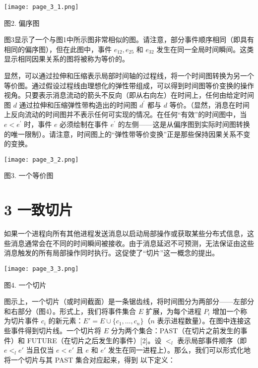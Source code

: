 \documentclass[12pt,a4paper]{report} %
\begin{document}
\begin{center}
\texttt{[image: page\_3\_1.png]}
\end{center}
\begin{center}
图2. 偏序图
\end{center}

图3显示了一个与图1中所示图非常相似的图。请注意，部分事件顺序相同（即具有相同的偏序图），但在此图中，事件 $e_{12}, e_{25}$ 和 $e_{32}$ 发生在同一全局时间瞬间。这类显示相同因果关系的图将被称为等价的。

显然，可以通过拉伸和压缩表示局部时间轴的过程线，将一个时间图转换为另一个等价图。通过假设过程线由理想化的弹性带组成，可以得到时间图等价变换的操作视角。只要表示消息流动的箭头不反向（即从右向左）在时间上，任何由给定时间图 $d$ 通过拉伸和压缩弹性带构造出的时间图 $d^{\prime}$ 都与 $d$ 等价。（显然，消息在时间上反向流动的时间图并不表示任何可实现的情况。在任何“有效”的时间图中，当 $e<e^{\prime}$ 时，事件 $e$ 必须绘制在事件 $e^{\prime}$ 的左侧——这是从偏序图到实际时间图转换的唯一限制）。请注意，时间图上的“弹性带等价变换”正是那些保持因果关系不变的变换。

\begin{center}
\texttt{[image: page\_3\_2.png]}
\end{center}
\begin{center}
图3. 一个等价图
\end{center}

\section*{3 一致切片}

如果一个进程向所有其他进程发送消息以启动局部操作或获取某些分布式信息，这些消息通常会在不同的时间瞬间被接收。由于消息延迟不可预测，无法保证由这些消息触发的所有局部操作同时执行。这促使了“切片”这一概念的提出。

\begin{center}
\texttt{[image: page\_3\_3.png]}
\end{center}
\begin{center}
图4. 一个切片
\end{center}

图示上，一个切片（或时间截面）是一条锯齿线，将时间图分为两部分——左部分和右部分（图4）。形式上，我们将事件集合 $E$ 扩展，为每个进程 $P_i$ 增加一个称为切片事件 $c_i$ 的新元素：$E' = E \cup \{c_1, \ldots, c_n\}$（$n$ 表示进程数量）。在图中连接这些事件得到切片线。一个切片将 $E$ 分为两个集合：PAST（在切片之前发生的事件）和 FUTURE（在切片之后发生的事件）[2]。设 $<_{l}$ 表示局部事件顺序（即 $e <_{l} e'$ 当且仅当 $e < e'$ 且 $e$ 和 $e'$ 发生在同一进程上）。那么，我们可以形式化地将一个切片与其 PAST 集合对应起来，得到
以下定义：
\end{document}
